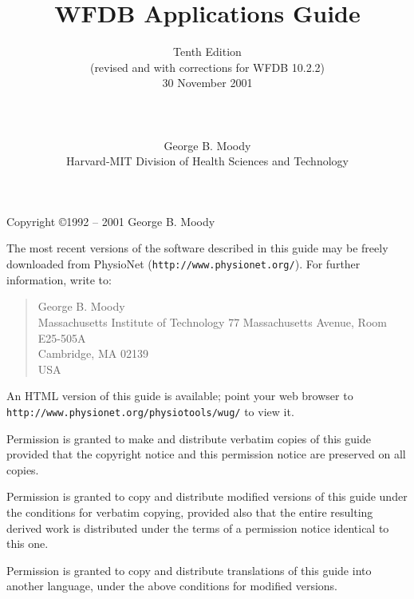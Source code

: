 \documentclass[twoside]{book}
\title{WFDB Applications Guide}
\author{Tenth Edition\\
(revised and with corrections for WFDB 10.2.2)\\
30 November 2001\\
\\
\\
\\
George B. Moody\\
Harvard-MIT Division of Health Sciences and Technology}
\date{}
\begin{document}
\maketitle

\pagestyle{empty}
\vspace*{\fill}
\noindent
Copyright \copyright 1992 -- 2001 George B. Moody

\vspace{1 in}
\noindent
The most recent versions of the software described in this guide may be
freely downloaded from PhysioNet ({\tt http://www.physionet.org/}).
For further information, write to:

\begin{quote}
George B. Moody\\
Massachusetts Institute of Technology
77 Massachusetts Avenue, Room E25-505A\\
Cambridge, MA 02139\\
USA\\
\end{quote}

An HTML version of this guide is available; point your web browser to
{\tt http://www.\-physio\-net.\-org/\-physio\-tools/\-wug/} to view it.

\vspace{0.2 in}
\noindent
Permission is granted to make and distribute verbatim copies of this
guide provided that the copyright notice and this permission notice are
preserved on all copies.

\vspace{0.2 in}
\noindent
Permission is granted to copy and distribute modified versions of this
guide under the conditions for verbatim copying, provided also that the
entire resulting derived work is distributed under the terms of a
permission notice identical to this one.

\vspace{0.2 in}
\noindent
Permission is granted to copy and distribute translations of this guide
into another language, under the above conditions for modified versions.
\end{document}
